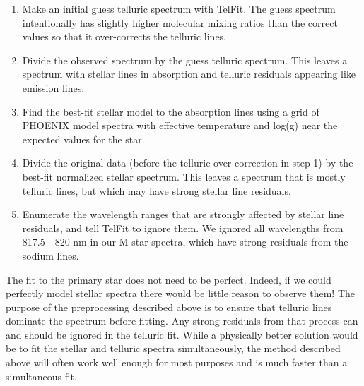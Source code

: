 \begin{enumerate}
  \item Make an initial guess telluric spectrum with TelFit. The guess spectrum intentionally has slightly higher molecular mixing ratios than the correct values so that it over-corrects the telluric lines.
  \item Divide the observed spectrum by the guess telluric spectrum. This leaves a spectrum with stellar lines in absorption and telluric residuals appearing like emission lines.
  \item Find the best-fit stellar model to the absorption lines using a grid of PHOENIX model spectra \citep{Hauschildt1999} with effective temperature and log(g) near the expected values for the star.
  \item Divide the original data (before the telluric over-correction in step 1) by the best-fit normalized stellar spectrum. This leaves a spectrum that is mostly telluric lines, but which may have strong stellar line residuals.
  \item Enumerate the wavelength ranges that are strongly affected by stellar line residuals, and tell TelFit to ignore them. We ignored all wavelengths from 817.5 - 820 nm in our M-star spectra, which have strong residuals from the sodium lines.
\end{enumerate}

The fit to the primary star does not need to be perfect. Indeed, if we could perfectly model stellar spectra there would be little reason to observe them! The purpose of the preprocessing described above is to ensure that telluric lines dominate the spectrum before fitting. Any strong residuals from that process can and should be ignored in the telluric fit. While a physically better solution would be to fit the stellar and telluric spectra simultaneously, the method described above will often work well enough  for most purposes and is much faster than a simultaneous fit.


